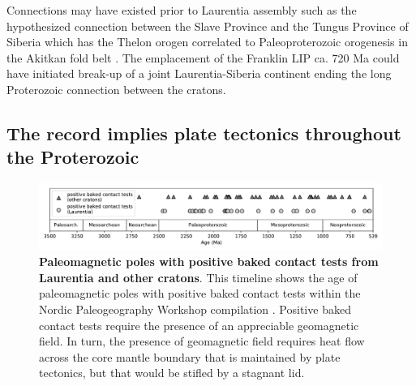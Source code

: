 \documentclass[twocolumn, switch]{article} %
\begin{document}
Connections may have existed prior to Laurentia assembly such as the hypothesized connection between the Slave Province and the Tungus Province of Siberia which has the Thelon orogen correlated to Paleoproterozoic orogenesis in the Akitkan fold belt \citep{Condie1994a, Rainbird1998a, Evans2011a}. The emplacement of the Franklin LIP ca. 720 Ma could have initiated break-up of a joint Laurentia-Siberia continent ending the long Proterozoic connection between the cratons. 

\subsection{The record implies plate tectonics throughout the Proterozoic}
\label{sec:plate_tectonics}

\begin{figure}
\centering
\includegraphics[width=\textwidth]{../Figures/baked_contact_timeline_all.pdf}
\caption{\textbf{Paleomagnetic poles with positive baked contact tests from Laurentia and other cratons}. This timeline shows the age of paleomagnetic poles with positive baked contact tests within the Nordic Paleogeography Workshop compilation \citep{Evans2021a}. Positive baked contact tests require the presence of an appreciable geomagnetic field. In turn, the presence of geomagnetic field requires heat flow across the core mantle boundary that is maintained by plate tectonics, but that would be stifled by a stagnant lid.}
\label{fig:baked_contact}
\end{figure}
\end{document}
